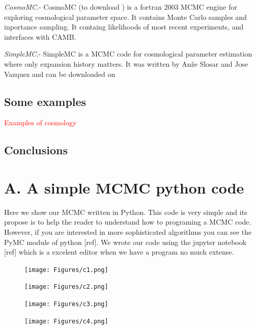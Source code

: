\documentclass[onecolumn,           %
               showpacs,            %
               preprintnumbers,     %
               aps,                 %
               prl,          	    %
               letterpaper,             %
               superscriptaddress,      %
               nofootinbib,         %
               tightenlines,        %
               floats,floatfix      %
               ,usenatbib,
               ]{revtex4-1}
\begin{document}
\textit{CosmoMC}.- CosmoMC (to download \cite{cosmomc}) is a fortran 2003 MCMC engine for exploring cosmological parameter space. It contains Monte Carlo samples and inportance sampling. It containg likelihoods of most recent experiments, and interfaces with CAMB.

\textit{SimpleMC}.- SimpleMC is a MCMC code for cosmological parameter estimation where only expansion history matters. It was written by Anže Slosar and Jose Vazquez and can be downloaded on \cite{simplemc}

\subsection{Some examples}
\textcolor{red}{Examples of cosmology}
\subsection{Conclusions}
\appendix
\section{A. A simple MCMC python code}

Here we show our MCMC written in Python. This code is very simple and its propose is to help the reader to understand how to programing a MCMC code. However, if you are interested in more sophisticated algorithms you can see the PyMC module of python [ref]. We wrote our code using the jupyter notebook [ref] which is a excelent editor when we have a program no much extense.  

\begin{figure}[h!]
\texttt{[image: Figures/c1.png]}
\end{figure}
\begin{figure}[h!]
\texttt{[image: Figures/c2.png]}
\end{figure}
\begin{figure}[h!]
\texttt{[image: Figures/c3.png]}
\end{figure}
\begin{figure}[h!]
\texttt{[image: Figures/c4.png]}
\end{figure}
\end{document}

